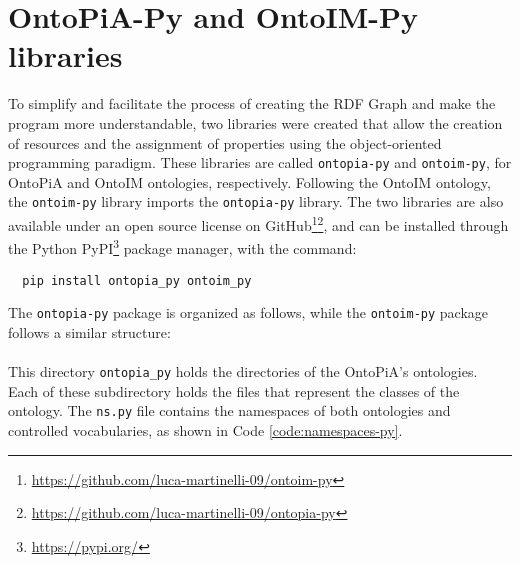 \section{OntoPiA-Py and OntoIM-Py libraries}
\label{sec:onto-py}

To simplify and facilitate the process of creating the \ac{RDF} Graph and make the program more understandable, two libraries were created that allow the creation of resources and the assignment of properties using the object-oriented programming paradigm. These libraries are called \verb#ontopia-py# and \verb#ontoim-py#, for OntoPiA and \ac{OntoIM} ontologies, respectively. Following the \ac{OntoIM} ontology, the \verb#ontoim-py# library imports the \verb#ontopia-py# library. The two libraries are also available under an open source license on GitHub\footnote{\url{https://github.com/luca-martinelli-09/ontoim-py}}\footnote{\url{https://github.com/luca-martinelli-09/ontopia-py}}, and can be installed through the Python PyPI\footnote{\url{https://pypi.org/}} package manager, with the command:

\begin{verbatim}
  pip install ontopia_py ontoim_py
\end{verbatim}

The \verb#ontopia-py# package is organized as follows, while the \verb#ontoim-py# package follows a similar structure:

\paragraph*{}

\paragraph*{}
This directory \verb#ontopia_py# holds the directories of the OntoPiA's ontologies. Each of these subdirectory holds the files that represent the classes of the ontology. The \verb#ns.py# file contains the namespaces of both ontologies and controlled vocabularies, as shown in Code \ref{code:namespaces-py}.


